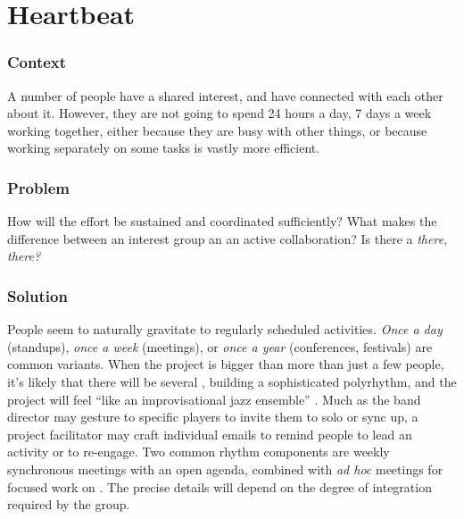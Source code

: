 \section{Heartbeat}\label{sec:Heartbeat}

\subsubsection*{Context}
A number of people have a shared interest, and have connected with each other about it.  However, they are not going to spend 24 hours a day, 7 days a week working together, either because they are busy with other things, or because working separately on some tasks is vastly more efficient.

\subsubsection*{Problem} How will the effort be sustained and coordinated sufficiently?  What makes the difference between an interest group an an active collaboration?  Is there a \emph{there, there?}

\subsubsection*{Solution} People seem to naturally gravitate to regularly scheduled activities.  \emph{Once a day} (standups), \emph{once a week} (meetings), or \emph{once a year} (conferences, festivals) are common variants.  When the project is bigger than more than just a few people, it's likely that there will be several , building a sophisticated polyrhythm, and the project will feel ``like an improvisational jazz ensemble'' \cite{david2001software}.  Much as the band director may gesture to specific players to invite them to solo or sync up, a project facilitator may craft individual emails to remind people to lead an activity or to re-engage.  Two common rhythm components are weekly synchronous meetings with an open agenda, combined with \emph{ad hoc} meetings for focused work on .  The precise details will depend on the degree of integration required by the group.

